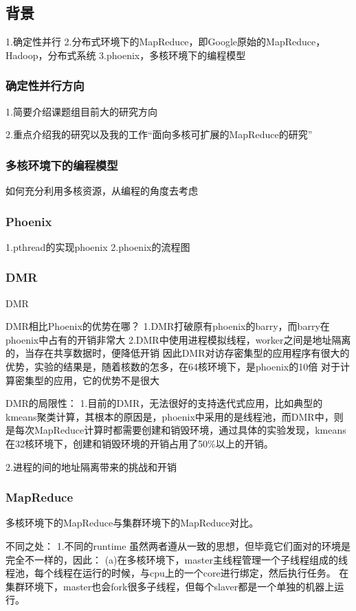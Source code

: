 \subsection{背景}
1.确定性并行
2.分布式环境下的MapReduce，即Google原始的MapReduce，Hadoop，分布式系统
3.phoenix，多核环境下的编程模型

\subsubsection{确定性并行方向}
1.简要介绍课题组目前大的研究方向

2.重点介绍我的研究以及我的工作“面向多核可扩展的MapReduce的研究”

\subsubsection{多核环境下的编程模型}
如何充分利用多核资源，从编程的角度去考虑


\subsubsection{Phoenix}
1.pthread的实现phoenix
2.phoenix的流程图


\subsubsection{DMR}
DMR

DMR相比Phoenix的优势在哪？
1.DMR打破原有phoenix的barry，而barry在phoenix中占有的开销非常大
2.DMR中使用进程模拟线程，worker之间是地址隔离的，当存在共享数据时，便降低开销
因此DMR对访存密集型的应用程序有很大的优势，实验的结果是，随着核数的怎多，在64核环境下，是phoenix的10倍
对于计算密集型的应用，它的优势不是很大

DMR的局限性：
1.目前的DMR，无法很好的支持迭代式应用，比如典型的kmeans聚类计算，其根本的原因是，phoenix中采用的是线程池，而DMR中，则是每次MapReduce计算时都需要创建和销毁环境，通过具体的实验发现，kmeans在32核环境下，创建和销毁环境的开销占用了50\%以上的开销。

2.进程的间的地址隔离带来的挑战和开销

\subsubsection{MapReduce}
多核环境下的MapReduce与集群环境下的MapReduce对比。

不同之处：
1.不同的runtime
虽然两者遵从一致的思想，但毕竟它们面对的环境是完全不一样的，因此：
(a)在多核环境下，master主线程管理一个子线程组成的线程池，每个线程在运行的时候，与cpu上的一个core进行绑定，然后执行任务。
在集群环境下，master也会fork很多子线程，但每个slaver都是一个单独的机器上运行。

